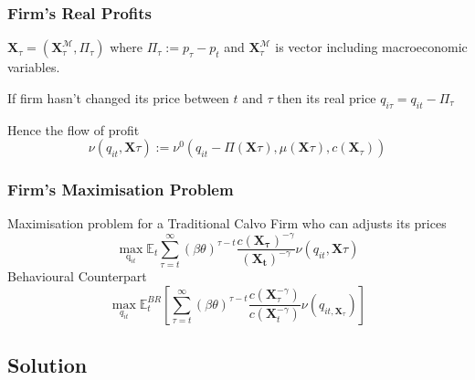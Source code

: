 \documentclass{beamer}
\begin{document}
\subsubsection{Firm's Real Profits}
\begin{frame}{\subsecname}

$\mathbf{X}_\tau=\left(\mathbf{X}_\tau^{\mathcal{M}}, \Pi_\tau\right)$ where $\Pi_\tau:= p_{\tau}-p_{t}$ and $\mathbf{X}_\tau^{\mathcal{M}}$ is vector including macroeconomic variables.

 If firm hasn't changed its price between $t$ and $\tau$
then its real price $q_{i\tau}= q_{it}- \Pi_{\tau}$ 

Hence the flow of profit 
\begin{equation}\tag{15}
    \nu\left(q_{it},\bm{X}{\tau}\right):=\nu^{0}\left(q_{it}-\Pi(\bm{X}{\tau}),\mu(\bm{X}{\tau}),c(\bm{X}_{\tau})\right)
\end{equation} 

\end{frame}
\subsubsection{Firm's Maximisation Problem}
\begin{frame}{\subsecname}
Maximisation problem for a Traditional Calvo Firm who can adjusts its prices
\begin{equation}\tag{16}
\max_{\text{q}_{it}} \mathbb{E}_{t} \sum_{\tau=t}^{\infty}(\beta\theta)^{\tau-t} \frac{c\left(\bm{X_{\tau}}\right)^{-\gamma}}{\left(\bm{X_{t}}\right)^{-\gamma}} \nu\left(q_{it},\bm{X}{\tau}\right)
\end{equation}
Behavioural Counterpart
\begin{equation}\tag{17}
    \max_{q_{it}}{\mathbb{E}_{t}^{BR} \left[\sum_{\tau=t}^{\infty}(\beta\theta)^{\tau-t}\frac{c\left(\bm{X}_{\tau}^{-\gamma}\right)}{c\left(\bm{X}_{t}^{-\gamma}\right)} \nu\left(q_{it,\bm{X}_{\tau}}\right) \right]}
\end{equation} 
\end{frame}
\subsection{Solution}
\end{document}
